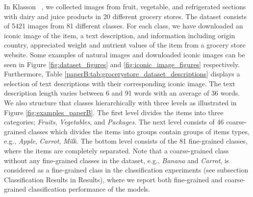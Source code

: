 In Klasson \etal~, we collected images from fruit, vegetable, and refrigerated sections with dairy and juice products in 20 different grocery stores.
The dataset consists of 5421 images from 81 different classes. For each class, we have downloaded an iconic image of the item, a text description, and information including origin country, appreciated weight and nutrient values of the item from a grocery store website. Some examples of natural images and downloaded iconic images can be seen in Figure \ref{fig:dataset_figures} and \ref{fig:iconic_image_figures} respectively. Furthermore, Table \ref{paperB:tab:grocerystore_dataset_descriptions} %
displays a selection of text descriptions with their corresponding iconic image. 
The text description length varies between 6 and 91 words with an average of 36 words. 
We also structure that classes hierarchically with three levels as illustrated in Figure \ref{fig:examples_paperB}. The first level divides the items into three categories; \textit{Fruits}, \textit{Vegetables}, and \textit{Packages}. The next level consists of 46 coarse-grained classes which divides the items into groups contain groups of items types, e.g., \textit{Apple}, \textit{Carrot}, \textit{Milk}. The bottom level consists of the 81 fine-grained classes, where the items are completely separated. Note that a coarse-grained class without any fine-grained classes in the dataset, e.g., \textit{Banana} and \textit{Carrot}, is considered as a fine-grained class in the classification experiments (see subsection Classification Results in Results),
where we report both fine-grained and coarse-grained classification performance of the models.

